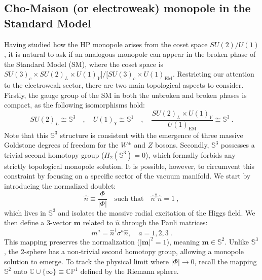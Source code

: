 \documentclass[a4paper,11pt]{article}
\begin{document}
\subsection{Cho-Maison (or electroweak) monopole in the Standard Model}
Having studied how the HP monopole arises from the coset space $SU(2)/U(1)$, it is natural to ask if an analogous monopole can appear in the broken phase of the Standard Model (SM), where the coset space is $SU(3)_c \times SU(2)_L \times U(1)_Y] / [SU(3)_c \times U(1)_{\text{EM}}$. Restricting our attention to the electroweak sector, there are two main topological aspects to consider. Firstly, the gauge group of the SM in both the unbroken and broken phases is compact, as the following isomorphisms hold:
\begin{equation}
    SU(2)_L \cong \mathbb S^3\quad ,\quad U(1)_Y \cong \mathbb S^1\quad,\quad   \frac{SU(2)_L \times U(1)_Y}{U(1)_{\text{EM}}} \cong \mathbb S^3\ .
\end{equation}
Note that this $\mathbb{S}^3$ structure is consistent with the emergence of three massive Goldstone degrees of freedom for the $W^{\pm}$ and $Z$ bosons. Secondly, $\mathbb{S}^3$ possesses a trivial second homotopy group ($\Pi_2(\mathbb{S}^3) = 0$), which formally forbids any strictly topological monopole solution. It is possible, however, to circumvent this constraint by focusing on a specific sector of the vacuum manifold. We start by introducing the normalized doublet:
\begin{equation}
    \hat{n} \equiv \frac{\Phi}{|\Phi|} \quad \text{such that}\quad \hat{n}^\dagger \hat{n}=1\ ,
\end{equation}
which lives in $\mathbb{S}^3$ and isolates the massive radial excitation of the Higgs field. We then define a 3-vector $\mathbf{m}$ related to $\hat{n}$ through the Pauli matrices:
\begin{equation}
    m^a = \hat{n}^\dagger \sigma^a \hat{n}, \quad a=1,2,3\ .
\end{equation}
This mapping preserves the normalization ($|\boldsymbol{m}|^2 = 1$), meaning $\boldsymbol{m} \in \mathbb{S}^2$. Unlike $\mathbb{S}^3$, the 2-sphere has a non-trivial second homotopy group, allowing a monopole solution to emerge. To track the physical limit where $|\Phi|\to 0$, recall the mapping $\mathbb{S}^2$ onto $\mathbb{C}\cup \{\infty\}\equiv \mathbb{C}\mathbb{P}^1 $ defined by the Riemann sphere.
\end{document}
